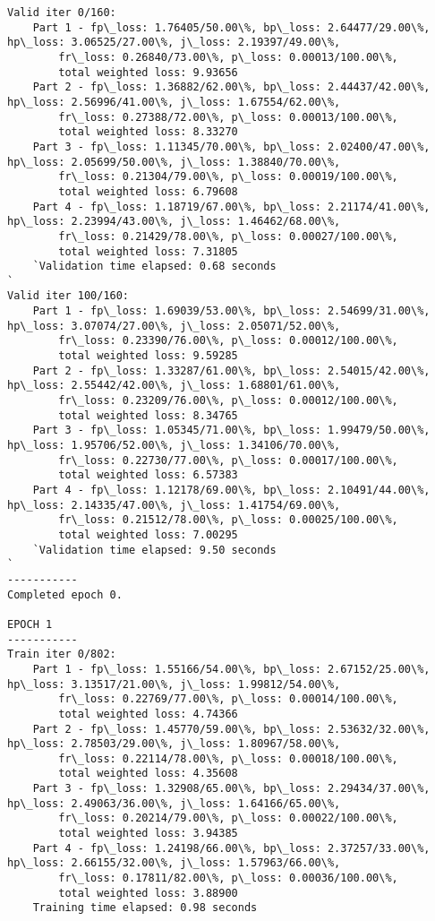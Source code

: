 \documentclass[11pt]{article}
\begin{document}
\begin{Verbatim}[commandchars=\\\{\}]
Valid iter 0/160:
	Part 1 - fp\_loss: 1.76405/50.00\%, bp\_loss: 2.64477/29.00\%, hp\_loss: 3.06525/27.00\%, j\_loss: 2.19397/49.00\%, 
		fr\_loss: 0.26840/73.00\%, p\_loss: 0.00013/100.00\%, 
		total weighted loss: 9.93656
	Part 2 - fp\_loss: 1.36882/62.00\%, bp\_loss: 2.44437/42.00\%, hp\_loss: 2.56996/41.00\%, j\_loss: 1.67554/62.00\%, 
		fr\_loss: 0.27388/72.00\%, p\_loss: 0.00013/100.00\%, 
		total weighted loss: 8.33270
	Part 3 - fp\_loss: 1.11345/70.00\%, bp\_loss: 2.02400/47.00\%, hp\_loss: 2.05699/50.00\%, j\_loss: 1.38840/70.00\%, 
		fr\_loss: 0.21304/79.00\%, p\_loss: 0.00019/100.00\%, 
		total weighted loss: 6.79608
	Part 4 - fp\_loss: 1.18719/67.00\%, bp\_loss: 2.21174/41.00\%, hp\_loss: 2.23994/43.00\%, j\_loss: 1.46462/68.00\%, 
		fr\_loss: 0.21429/78.00\%, p\_loss: 0.00027/100.00\%, 
		total weighted loss: 7.31805
	`Validation time elapsed: 0.68 seconds
`
Valid iter 100/160:
	Part 1 - fp\_loss: 1.69039/53.00\%, bp\_loss: 2.54699/31.00\%, hp\_loss: 3.07074/27.00\%, j\_loss: 2.05071/52.00\%, 
		fr\_loss: 0.23390/76.00\%, p\_loss: 0.00012/100.00\%, 
		total weighted loss: 9.59285
	Part 2 - fp\_loss: 1.33287/61.00\%, bp\_loss: 2.54015/42.00\%, hp\_loss: 2.55442/42.00\%, j\_loss: 1.68801/61.00\%, 
		fr\_loss: 0.23209/76.00\%, p\_loss: 0.00012/100.00\%, 
		total weighted loss: 8.34765
	Part 3 - fp\_loss: 1.05345/71.00\%, bp\_loss: 1.99479/50.00\%, hp\_loss: 1.95706/52.00\%, j\_loss: 1.34106/70.00\%, 
		fr\_loss: 0.22730/77.00\%, p\_loss: 0.00017/100.00\%, 
		total weighted loss: 6.57383
	Part 4 - fp\_loss: 1.12178/69.00\%, bp\_loss: 2.10491/44.00\%, hp\_loss: 2.14335/47.00\%, j\_loss: 1.41754/69.00\%, 
		fr\_loss: 0.21512/78.00\%, p\_loss: 0.00025/100.00\%, 
		total weighted loss: 7.00295
	`Validation time elapsed: 9.50 seconds
`
-----------
Completed epoch 0.

EPOCH 1
-----------
Train iter 0/802:
	Part 1 - fp\_loss: 1.55166/54.00\%, bp\_loss: 2.67152/25.00\%, hp\_loss: 3.13517/21.00\%, j\_loss: 1.99812/54.00\%, 
		fr\_loss: 0.22769/77.00\%, p\_loss: 0.00014/100.00\%, 
		total weighted loss: 4.74366
	Part 2 - fp\_loss: 1.45770/59.00\%, bp\_loss: 2.53632/32.00\%, hp\_loss: 2.78503/29.00\%, j\_loss: 1.80967/58.00\%, 
		fr\_loss: 0.22114/78.00\%, p\_loss: 0.00018/100.00\%, 
		total weighted loss: 4.35608
	Part 3 - fp\_loss: 1.32908/65.00\%, bp\_loss: 2.29434/37.00\%, hp\_loss: 2.49063/36.00\%, j\_loss: 1.64166/65.00\%, 
		fr\_loss: 0.20214/79.00\%, p\_loss: 0.00022/100.00\%, 
		total weighted loss: 3.94385
	Part 4 - fp\_loss: 1.24198/66.00\%, bp\_loss: 2.37257/33.00\%, hp\_loss: 2.66155/32.00\%, j\_loss: 1.57963/66.00\%, 
		fr\_loss: 0.17811/82.00\%, p\_loss: 0.00036/100.00\%, 
		total weighted loss: 3.88900
	Training time elapsed: 0.98 seconds


\end{Verbatim}
\end{document}
